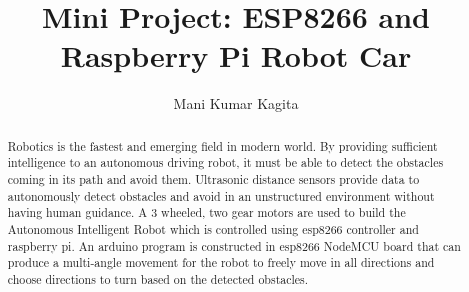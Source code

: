 

\def\paperstatus{100} %
\def\paperchapter{Edge Computing} %
\def\hid{hid-sp18-711} %
\def\volume{10} %

\def\locator{\hid, Volume: \volume, Chapter: \paperchapter, Status: 
\paperstatus. \newline}


\title{Mini Project: ESP8266 and Raspberry Pi Robot Car}


\author{Mani Kumar Kagita}


\renewcommand{\shortauthors}{Mani Kumar Kagita}


\begin{abstract}
Robotics is the fastest and emerging field in modern world. By providing 
sufficient intelligence to an autonomous driving robot, it must be able to 
detect the obstacles coming in its path and avoid them. Ultrasonic distance 
sensors provide data to autonomously detect obstacles and avoid in an 
unstructured environment without having human guidance. A 3 wheeled, two 
gear motors are used to build the Autonomous Intelligent Robot which is 
controlled using esp8266 controller and raspberry pi. 
An arduino program is constructed in esp8266 NodeMCU board that can produce 
a multi-angle movement for the robot to freely move in all directions and 
choose directions to turn based on the detected obstacles. 

\end{abstract}


